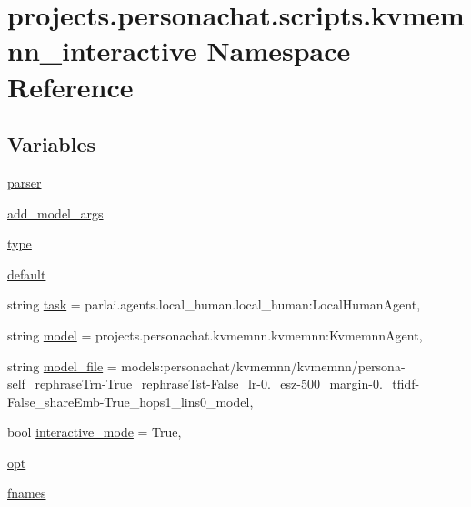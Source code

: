 \hypertarget{namespaceprojects_1_1personachat_1_1scripts_1_1kvmemnn__interactive}{}\section{projects.\+personachat.\+scripts.\+kvmemnn\+\_\+interactive Namespace Reference}
\label{namespaceprojects_1_1personachat_1_1scripts_1_1kvmemnn__interactive}
\subsection*{Variables}
\begin{DoxyCompactItemize}
\item 
\hyperlink{namespaceprojects_1_1personachat_1_1scripts_1_1kvmemnn__interactive_aa6bd5f5f1d91f5e7edc9da941b6de0a3}{parser}
\item 
\hyperlink{namespaceprojects_1_1personachat_1_1scripts_1_1kvmemnn__interactive_a5450b4eed2846577dbec4810fcc50d69}{add\+\_\+model\+\_\+args}
\item 
\hyperlink{namespaceprojects_1_1personachat_1_1scripts_1_1kvmemnn__interactive_a25e48e7bed4c9d56601844942f2afa61}{type}
\item 
\hyperlink{namespaceprojects_1_1personachat_1_1scripts_1_1kvmemnn__interactive_a84b81c4d7eeffba8f346ef0bb317226f}{default}
\item 
string \hyperlink{namespaceprojects_1_1personachat_1_1scripts_1_1kvmemnn__interactive_a560ff903393aa836b63a226a390395e5}{task} = \textquotesingle{}parlai.\+agents.\+local\+\_\+human.\+local\+\_\+human\+:\+Local\+Human\+Agent\textquotesingle{},
\item 
string \hyperlink{namespaceprojects_1_1personachat_1_1scripts_1_1kvmemnn__interactive_ac889b5cd198c711f57f97b2b86083bb0}{model} = \textquotesingle{}projects.\+personachat.\+kvmemnn.\+kvmemnn\+:\+Kvmemnn\+Agent\textquotesingle{},
\item 
string \hyperlink{namespaceprojects_1_1personachat_1_1scripts_1_1kvmemnn__interactive_a16cb5452754b555bd4534954d5f2734f}{model\+\_\+file} = \textquotesingle{}models\+:personachat/kvmemnn/kvmemnn/persona-\/self\+\_\+rephrase\+Trn-\/True\+\_\+rephrase\+Tst-\/False\+\_\+lr-\/0.\+\_\+esz-\/500\+\_\+margin-\/0.\+\_\+tfidf-\/\+False\+\_\+share\+Emb-\/\+True\+\_\+hops1\+\_\+lins0\+\_\+model\textquotesingle{},
\item 
bool \hyperlink{namespaceprojects_1_1personachat_1_1scripts_1_1kvmemnn__interactive_a917c4904fded8fb3cf39c4c86b0c3db7}{interactive\+\_\+mode} = True,
\item 
\hyperlink{namespaceprojects_1_1personachat_1_1scripts_1_1kvmemnn__interactive_ab484b07bfdf7096326f2d79a4ee1b258}{opt}
\item 
\hyperlink{namespaceprojects_1_1personachat_1_1scripts_1_1kvmemnn__interactive_aaa67dfd1d603abd98394dafc5ba2bf7e}{fnames}
\end{DoxyCompactItemize}


